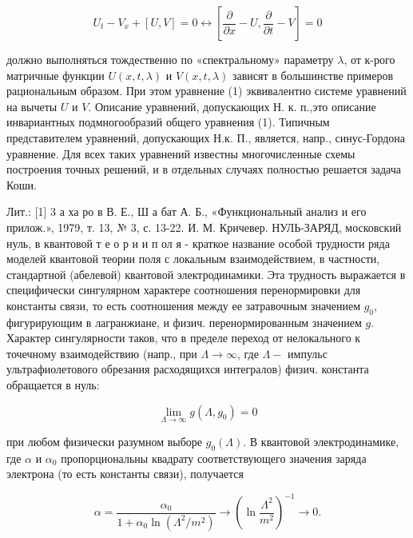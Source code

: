 \documentclass[10pt]{article}
\begin{document}
\[

U_{t}-V_{x}+[U, V]=0 \leftrightarrow\left[\frac{\partial}{\partial x}-U, \frac{\partial}{\partial t}-V\right]=0

\]



должно выполняться тождественно по «спектральному» параметру $\lambda$, от к-рого матричные функции $U(x, t, \lambda)$ и $V(x, t, \lambda)$ зависят в большинстве примеров рациональным образом. При этом уравнение (1) эквивалентно системе уравнений на вычеты $U$ и $V$. Описание уравнений, допускающих Н. к. п.,это описание инвариантных подмногообразий общего уравнения (1). Типичным представителем уравнений, допускающих Н.к. П., является, напр., синус-Гордона уравнение. Для всех таких уравнений известны многочисленные схемы построения точных решений, и в отдельных случаях полностью решается задача Коши.



Лит.: [1] 3 а ха ро в В. Е., Ш а бат А. Б., «Функциональный анализ и его прилож.», 1979, т. 13, № 3, с. 13-22. И. М. Кричевер. НУЛЬ-ЗАРЯД, московский нуль, в квантовой т е о р и и п ол я - краткое название особой трудности ряда моделей квантовой теории поля с локальным взаимодействием, в частности, стандартной (абелевой) квантовой электродинамики. Эта трудность выражается в специфически сингулярном характере соотношения перенормировки для константы связи, то есть соотношения между ее затравочным значением $g_{0}$, фигурирующим в лагранжиане, и физич. перенормированным значением $g$. Характер сингулярности таков, что в пределе переход от нелокального к точечному взаимодействию (напр., при $\Lambda \rightarrow \infty$, где $\Lambda-$ импульс ультрафиолетового обрезания расходящихся интегралов) физич. константа обращается в нуль:



\[

\lim _{\Lambda \rightarrow \infty} g\left(\Lambda, g_{0}\right)=0

\]



при любом физически разумном выборе $g_{0}(\Lambda)$. В квантовой электродинамике, где $\alpha$ и $\alpha_{0}$ пропорциональны квадрату соответствующего значения заряда электрона (то есть константы связи), получается



\[

\alpha=\frac{\alpha_{0}}{1+\alpha_{0} \ln \left(\Lambda^{2} / m^{2}\right)} \rightarrow\left(\ln \frac{\Lambda^{2}}{m^{2}}\right)^{-1} \rightarrow 0 .

\]
\end{document}
